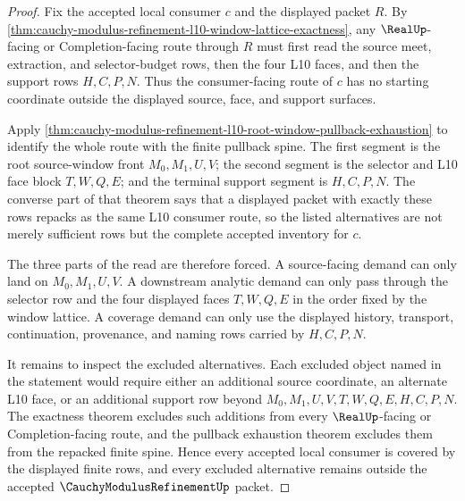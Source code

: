 \begin{proof}
Fix the accepted local consumer $c$ and the displayed packet $R$. By \autoref{thm:cauchy-modulus-refinement-l10-window-lattice-exactness}, any $\RealUp$-facing or Completion-facing route through $R$ must first read the source meet, extraction, and selector-budget rows, then the four L10 faces, and then the support rows $H,C,P,N$. Thus the consumer-facing route of $c$ has no starting coordinate outside the displayed source, face, and support surfaces.

Apply \autoref{thm:cauchy-modulus-refinement-l10-root-window-pullback-exhaustion} to identify the whole route with the finite pullback spine. The first segment is the root source-window front $M_0,M_1,U,V$; the second segment is the selector and L10 face block $T,W,Q,E$; and the terminal support segment is $H,C,P,N$. The converse part of that theorem says that a displayed packet with exactly these rows repacks as the same L10 consumer route, so the listed alternatives are not merely sufficient rows but the complete accepted inventory for $c$.

The three parts of the read are therefore forced. A source-facing demand can only land on $M_0,M_1,U,V$. A downstream analytic demand can only pass through the selector row and the four displayed faces $T,W,Q,E$ in the order fixed by the window lattice. A coverage demand can only use the displayed history, transport, continuation, provenance, and naming rows carried by $H,C,P,N$.

It remains to inspect the excluded alternatives. Each excluded object named in the statement would require either an additional source coordinate, an alternate L10 face, or an additional support row beyond $M_0,M_1,U,V,T,W,Q,E,H,C,P,N$. The exactness theorem excludes such additions from every $\RealUp$-facing or Completion-facing route, and the pullback exhaustion theorem excludes them from the repacked finite spine. Hence every accepted local consumer is covered by the displayed finite rows, and every excluded alternative remains outside the accepted $\CauchyModulusRefinementUp$ packet.
\end{proof}

